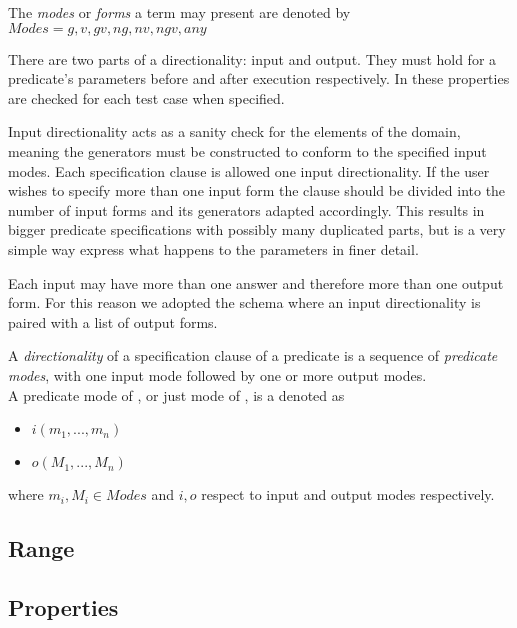 \begin{definition}
\label{def:modes}
The \emph{modes} or \emph{forms} a term may present are denoted by\\
 $Modes = {g, v, gv, ng, nv, ngv, any}$
\end{definition}


There are two parts of a directionality: input and output.
%
They must hold for a predicate's parameters before and after execution
respectively.
%
In \plqc{} these properties are checked for each test case when
specified.


Input directionality acts as a sanity check for the elements of the
domain, meaning the generators must be constructed to conform to the
specified input modes.
%
Each specification clause is allowed one input directionality.
%
If the user wishes to specify more than one input form the clause should
be divided into the number of input forms and its generators adapted
accordingly.
%
This results in bigger predicate specifications with possibly many
duplicated parts, but is a very simple way express what happens to the
parameters in finer detail.


Each input may have more than one answer and therefore more than one
output form.
%
For this reason we adopted the schema where an input directionality is
paired with a list of output forms.


\begin{definition}
\label{def:directionality}
A \emph{directionality} of a specification clause of a predicate
 is a sequence of \emph{predicate modes}, with one input mode
followed by one or more output modes.
\\
A predicate mode of , or just mode of , is a denoted as
\begin{itemize}
  \item $i(m_1, ..., m_n)$
  \item $o(M_1, ..., M_n)$
\end{itemize}
where $m_i,M_i \in Modes$ and $i, o$ respect to input and output modes
respectively.
\end{definition}


\subsection{Range}
\subsection{Properties}

